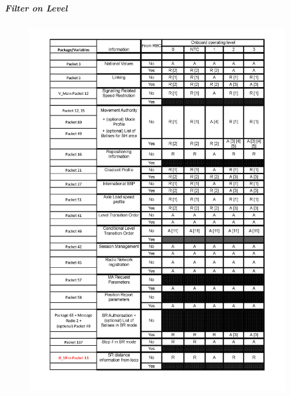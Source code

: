 \subparagraph{Filter on Level}
\begin{figure}[hbtp]
\centering
\includegraphics [scale=0.6]{images/LevelFilter1}
\end{figure}
